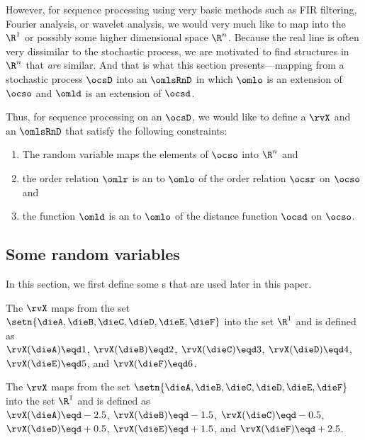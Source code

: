 However, for sequence processing using very basic methods such as FIR filtering, Fourier analysis,
or wavelet analysis,
we would very much like to map into the  $\R^1$ or possibly some higher dimensional space
$\R^n$.
Because the real line is often very dissimilar to the stochastic process,
we are motivated to find structures in $\R^n$ that \emph{are} similar.
And that is what this section presents---mapping from a stochastic process $\ocsD$ 
into an  $\omlsRnD$ in which $\omlo$ is an extension of $\ocso$ and
$\omld$ is an extension of $\ocsd$.

Thus, for sequence processing on an  $\ocsD$, we would like to 
define a  $\rvX$ and an  $\omlsRnD$ 
that satisfy the following constraints: 
\begin{enumerate}
  \item The random variable maps the elements of $\ocso$ into $\R^n$ and
  \item the order relation $\omlr$ is an  to $\omlo$ of the order relation $\ocsr$ on $\ocso$ and
  \item the  function $\omld$ is an  to $\omlo$ of the distance function $\ocsd$ on $\ocso$.
\end{enumerate}

\subsection{Some random variables}
In this section, we first define some s  
that are used later in this paper.
\begin{definition}
\label{def:rv_dietrad}
The  $\rvX$ maps from the set %
\\$\setn{\dieA,\dieB,\dieC,\dieD,\dieE,\dieF}$ into the set $\R^1$
and is defined as\footnotemark
\\\indentx
  $\rvX(\dieA)\eqd 1$, 
  $\rvX(\dieB)\eqd 2$, 
  $\rvX(\dieC)\eqd 3$, 
  $\rvX(\dieD)\eqd 4$, 
  $\rvX(\dieE)\eqd 5$, and 
  $\rvX(\dieF)\eqd 6$.
\end{definition}

\begin{definition}
\label{def:rv_diepam}
The  $\rvX$ maps from the set $\setn{\dieA,\dieB,\dieC,\dieD,\dieE,\dieF}$ into the set $\R^1$
and is defined as\footnotemark
\\\indentx
  $\rvX(\dieA)\eqd-2.5$, 
  $\rvX(\dieB)\eqd-1.5$, 
  $\rvX(\dieC)\eqd-0.5$, 
  $\rvX(\dieD)\eqd+0.5$, 
  $\rvX(\dieE)\eqd+1.5$, and 
  $\rvX(\dieF)\eqd+2.5$.
\end{definition}

